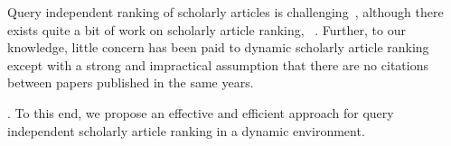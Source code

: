 Query independent ranking of scholarly articles is challenging~\cite{wsdmcup}, although there exists quite a bit of work on scholarly article ranking, \eg~\cite{Garfield471,ChenXMR07,Zhou07-CoRank,ShenAAAI16,Liang16AAAI,Jiang12-MRank,Waltman2014}.
Further, to our knowledge, little concern has been paid to dynamic scholarly article ranking except \cite{GhoshKHLL11} with a strong and impractical assumption that there are no citations between papers published in the same years.





.
To this end, we propose an effective and efficient approach for query independent scholarly article ranking in a dynamic environment.

